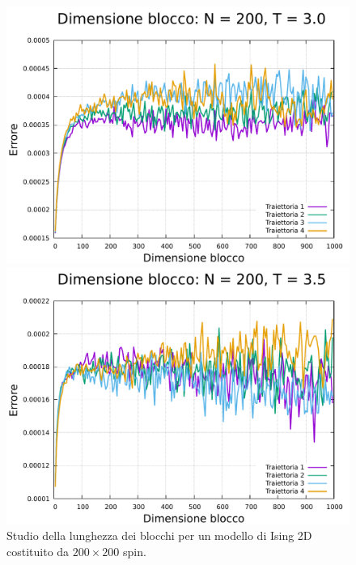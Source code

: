 \begin{figure}[htbp]
    \begin{minipage}{0.45\textwidth}  
        \centering
        \includegraphics[page=1, width=\textwidth]{Immagini/simIsing2D/metro/lblk/err_200_3.0.pdf}
        \caption{$T\,=\,3.0$}
      \end{minipage}\hfill
      \begin{minipage}{0.45\textwidth}  
        \centering
        \includegraphics[page=1, width=\textwidth]{Immagini/simIsing2D/metro/lblk/err_200_3.5.pdf}
        \caption{$T\,=\,3.5$}
    \end{minipage}

    \caption{Studio della lunghezza dei blocchi per un modello di Ising 2D costituito da $200 \times 200$ spin.}
\end{figure}

